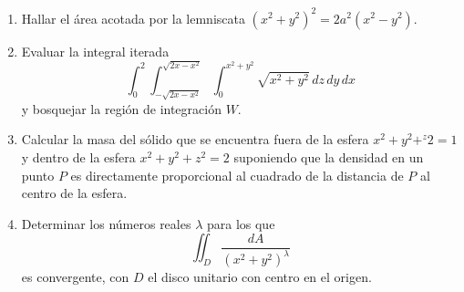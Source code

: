 \documentclass{article}
\begin{document}
\begin{enumerate}
        \item {
            Hallar el área acotada por la lemniscata
            \(
                \left(x^2+y^2\right)^2=2a^2\left(x^2-y^2\right)
            \).

            \color{azul}
        }

        \item {
            Evaluar la integral iterada
            \[
                \int_{0}^{2}{
                    \int_{-\sqrt{2x-x^2}}^{\sqrt{2x-x^2}}{
                        \int_{0}^{x^2+y^2}{
                            \sqrt{x^2+y^2}
                        \,dz}
                    \,dy}
                \,dx}
            \]
            y bosquejar la región de integración $W$.

            \color{azul}
        }

        \item {
            Calcular la masa del sólido que se encuentra fuera de la esfera
            $x^2+y^2+^z2=1$ y dentro de la esfera $x^2+y^2+z^2=2$ suponiendo
            que la densidad en un punto $P$ es directamente proporcional al
            cuadrado de la distancia de $P$ al centro de la esfera.

            \color{azul}
        }

        \item {
            Determinar los números reales $\lambda$ para los que
            \[
                \iint_D {\frac{dA}{\left(x^2+y^2\right)^\lambda}}
            \]
            es convergente, con $D$ el disco unitario con centro en el origen.

}
\end{enumerate}
\end{document}
